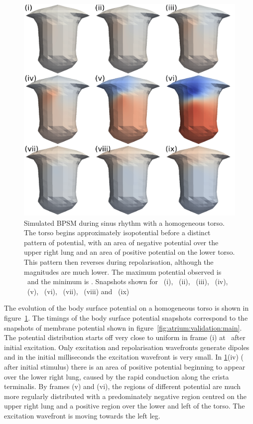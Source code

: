 \begin{figure}
\includegraphics{figures/bsp/bsp_torso}
\caption[Body Surface Potential snapshots, homogeneous torso]{
\label{bsp:fig:homo_bsp}
Simulated BPSM during sinus rhythm with a homogeneous
torso.
The torso begins approximately isopotential before a distinct pattern of
potential, with an area of negative potential over the upper right lung and an
area of positive potential on the lower torso.
This pattern then reverses during repolarisation, although the magnitudes are
much lower.
The maximum potential observed is \ and the minimum is .
Snapshots shown for \ (i), \ (ii), \ (iii), \ (iv),
\ (v), \ (vi), \ (vii), \ (viii) and \
(ix)
}
\end{figure}

The evolution of the body surface potential on a homogeneous torso is shown in
figure~\ref{bsp:fig:homo_bsp}.
The timings of the body surface potential snapshots correspond to the snapshots
of membrane potential shown in figure~\ref{fig:atrium:validation:main}.
The potential distribution starts off very close to uniform in frame (i) at
\ms{10}\ after initial excitation.
Only excitation and repolarisation wavefronts generate dipoles and in the
initial milliseconds the excitation wavefront is very small.
In \ref{bsp:fig:homo_bsp}(iv) ( after initial stimulus) there is an area
of positive potential beginning to appear over the lower right lung, caused by
the rapid conduction along the crista terminalis.
By frames (v) and (vi), the regions of different potential are much more
regularly distributed with a predominately negative region centred on the upper
right lung and a positive region over the lower and left of the torso.
The excitation wavefront is moving towards the left leg.

